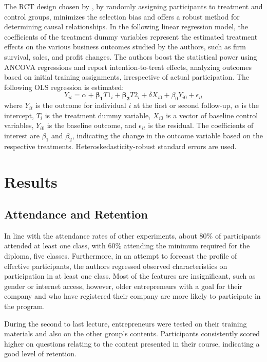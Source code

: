 The RCT design chosen by \cite{Ubfal2022}, by randomly assigning participants to treatment and control groups, minimizes the selection bias and offers a robust method for determining causal relationships. In the following linear regression model, the coefficients of the treatment dummy variables represent the estimated treatment effects on the various business outcomes studied by the authors, such as firm survival, sales, and profit changes. The authors boost the statistical power using ANCOVA regressions and report intention-to-treat effects, analyzing outcomes based on initial training assignments, irrespective of actual participation. The following OLS regression is estimated:
\begin{equation}
Y_{it}=\alpha+\boldsymbol{\beta_1}T1_i+\boldsymbol{\beta_2}T2_i+\delta X_{i0}+\beta_0Y_{i0}+\epsilon_{it}
\end{equation}
where $Y_{it}$ is the outcome for individual $i$ at the first or second follow-up, $\alpha$ is the intercept, $T_i$ is the treatment dummy variable, $X_{i0}$ is a vector of baseline control variables, $Y_{i0}$ is the baseline outcome, and $\epsilon_{it}$ is the residual. The coefficients of interest are $\beta_1$ and $\beta_2$, indicating the change in the outcome variable based on the respective treatments. Heteroskedasticity-robust standard errors are used.

\vspace{-5px}

\section{Results}

\subsection{Attendance and Retention}

In line with the attendance rates of other experiments, about 80\% of participants attended at least one class, with 60\% attending the minimum required for the diploma, five classes. Furthermore, in an attempt to forecast the profile of effective participants, the authors regressed observed characteristics on participation in at least one class. Most of the features are insignificant, such as gender or internet access, however, older entrepreneurs with a goal for their company and who have registered their company are more likely to participate in the program.

During the second to last lecture, entrepreneurs were tested on their training materials and also on the other group's contents. Participants consistently scored higher on questions relating to the content presented in their course, indicating a good level of retention.

